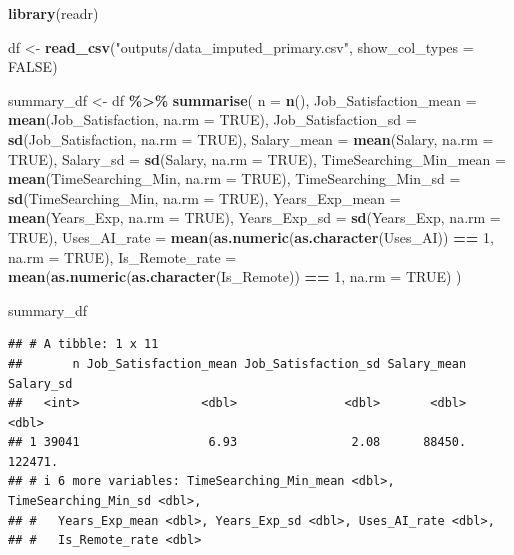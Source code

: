 \documentclass[
]{article}
\newenvironment{Shaded}{\begin{snugshade}}{\end{snugshade}}
\newcommand{\AttributeTok}[1]{\textcolor[rgb]{0.13,0.29,0.53}{#1}}
\newcommand{\ConstantTok}[1]{\textcolor[rgb]{0.56,0.35,0.01}{#1}}
\newcommand{\DecValTok}[1]{\textcolor[rgb]{0.00,0.00,0.81}{#1}}
\newcommand{\FunctionTok}[1]{\textcolor[rgb]{0.13,0.29,0.53}{\textbf{#1}}}
\newcommand{\NormalTok}[1]{#1}
\newcommand{\OtherTok}[1]{\textcolor[rgb]{0.56,0.35,0.01}{#1}}
\newcommand{\SpecialCharTok}[1]{\textcolor[rgb]{0.81,0.36,0.00}{\textbf{#1}}}
\newcommand{\StringTok}[1]{\textcolor[rgb]{0.31,0.60,0.02}{#1}}
\begin{document}
\begin{Shaded}
\begin{Highlighting}[]
\FunctionTok{library}\NormalTok{(readr)}

\NormalTok{df }\OtherTok{\textless{}{-}} \FunctionTok{read\_csv}\NormalTok{(}\StringTok{"outputs/data\_imputed\_primary.csv"}\NormalTok{, }\AttributeTok{show\_col\_types =} \ConstantTok{FALSE}\NormalTok{)}

\NormalTok{summary\_df }\OtherTok{\textless{}{-}}\NormalTok{ df }\SpecialCharTok{\%\textgreater{}\%}
  \FunctionTok{summarise}\NormalTok{(}
    \AttributeTok{n =} \FunctionTok{n}\NormalTok{(),}
    \AttributeTok{Job\_Satisfaction\_mean =} \FunctionTok{mean}\NormalTok{(Job\_Satisfaction, }\AttributeTok{na.rm =} \ConstantTok{TRUE}\NormalTok{),}
    \AttributeTok{Job\_Satisfaction\_sd =} \FunctionTok{sd}\NormalTok{(Job\_Satisfaction, }\AttributeTok{na.rm =} \ConstantTok{TRUE}\NormalTok{),}
    \AttributeTok{Salary\_mean =} \FunctionTok{mean}\NormalTok{(Salary, }\AttributeTok{na.rm =} \ConstantTok{TRUE}\NormalTok{),}
    \AttributeTok{Salary\_sd =} \FunctionTok{sd}\NormalTok{(Salary, }\AttributeTok{na.rm =} \ConstantTok{TRUE}\NormalTok{),}
    \AttributeTok{TimeSearching\_Min\_mean =} \FunctionTok{mean}\NormalTok{(TimeSearching\_Min, }\AttributeTok{na.rm =} \ConstantTok{TRUE}\NormalTok{),}
    \AttributeTok{TimeSearching\_Min\_sd =} \FunctionTok{sd}\NormalTok{(TimeSearching\_Min, }\AttributeTok{na.rm =} \ConstantTok{TRUE}\NormalTok{),}
    \AttributeTok{Years\_Exp\_mean =} \FunctionTok{mean}\NormalTok{(Years\_Exp, }\AttributeTok{na.rm =} \ConstantTok{TRUE}\NormalTok{),}
    \AttributeTok{Years\_Exp\_sd =} \FunctionTok{sd}\NormalTok{(Years\_Exp, }\AttributeTok{na.rm =} \ConstantTok{TRUE}\NormalTok{),}
    \AttributeTok{Uses\_AI\_rate =} \FunctionTok{mean}\NormalTok{(}\FunctionTok{as.numeric}\NormalTok{(}\FunctionTok{as.character}\NormalTok{(Uses\_AI)) }\SpecialCharTok{==} \DecValTok{1}\NormalTok{, }\AttributeTok{na.rm =} \ConstantTok{TRUE}\NormalTok{),}
    \AttributeTok{Is\_Remote\_rate =} \FunctionTok{mean}\NormalTok{(}\FunctionTok{as.numeric}\NormalTok{(}\FunctionTok{as.character}\NormalTok{(Is\_Remote)) }\SpecialCharTok{==} \DecValTok{1}\NormalTok{, }\AttributeTok{na.rm =} \ConstantTok{TRUE}\NormalTok{)}
\NormalTok{  )}

\NormalTok{summary\_df}
\end{Highlighting}
\end{Shaded}

\begin{verbatim}
## # A tibble: 1 x 11
##       n Job_Satisfaction_mean Job_Satisfaction_sd Salary_mean Salary_sd
##   <int>                 <dbl>               <dbl>       <dbl>     <dbl>
## 1 39041                  6.93                2.08      88450.   122471.
## # i 6 more variables: TimeSearching_Min_mean <dbl>, TimeSearching_Min_sd <dbl>,
## #   Years_Exp_mean <dbl>, Years_Exp_sd <dbl>, Uses_AI_rate <dbl>,
## #   Is_Remote_rate <dbl>
\end{verbatim}
\end{document}
